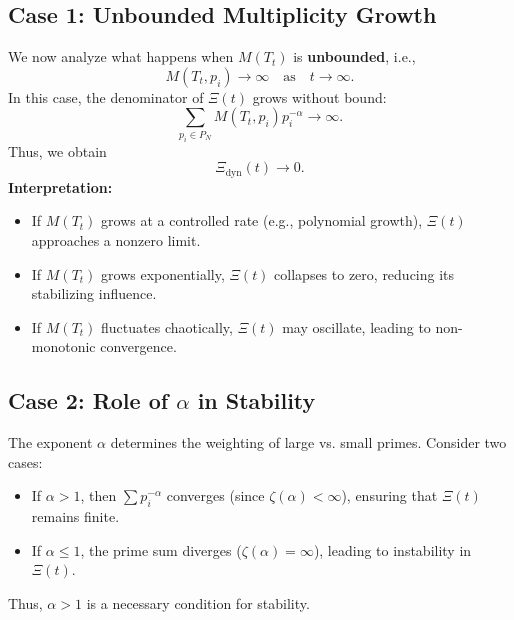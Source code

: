 \documentclass{article}
\theoremstyle{plain}
\begin{document}
\begin{itemize}
\subsection{Case 1: Unbounded Multiplicity Growth}
We now analyze what happens when \( M(T_t) \) is \textbf{unbounded}, i.e.,
\begin{equation}
    M(T_t, p_i) \to \infty \quad \text{as} \quad t \to \infty.
\end{equation}
In this case, the denominator of \(\Xi(t) \) grows without bound:
\begin{equation}
    \sum_{p_i \in P_N} M(T_t, p_i) p_i^{-\alpha} \to \infty.
\end{equation}
Thus, we obtain
\begin{equation}
    \Xi_{\text{dyn}}(t) \to 0.
\end{equation}
\textbf{Interpretation:}
\begin{itemize}
    \item If \( M(T_t) \) grows at a controlled rate (e.g., polynomial growth), \(\Xi(t) \) approaches a nonzero limit.
    \item If \( M(T_t) \) grows exponentially, \(\Xi(t) \) collapses to zero, reducing its stabilizing influence.
    \item If \( M(T_t) \) fluctuates chaotically, \(\Xi(t) \) may oscillate, leading to non-monotonic convergence.
\end{itemize}

\subsection{Case 2: Role of \( \alpha \) in Stability}
The exponent \( \alpha \) determines the weighting of large vs. small primes. Consider two cases:
\begin{itemize}
    \item If \( \alpha > 1 \), then \( \sum p_i^{-\alpha} \) converges (since \( \zeta(\alpha) < \infty \)), ensuring that \(\Xi(t) \) remains finite.
    \item If \( \alpha \leq 1 \), the prime sum diverges (\( \zeta(\alpha) = \infty \)), leading to instability in \(\Xi(t) \).
\end{itemize}
Thus, \( \alpha > 1 \) is a necessary condition for stability.


\end{itemize}
\end{document}

